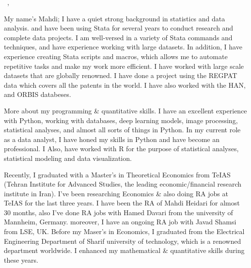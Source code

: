\documentclass[12pt]{letter}
\begin{document}
\AddToShipoutPictureBG{%
    \color{gr}
    \AtPageUpperLeft{\rule[-1.3in]{\paperwidth}{1.3in}}
}

\begin{center}
    {\fontsize{28}{0}\selectfont\scshape \myname}

    \href{mailto:\myemail}{\faEnvelope\enspace \myemail}\hfill
    \href{tel:\myphone}{\faPhone\enspace \myphone}\hfill
    \faMapMarker \enspace \mylocation
\end{center}

\vspace{0.3in}



\vspace{-0.1in}

\greeting\
\recipient,\\

\vspace{-0.1in}\setlength\parindent{24pt}

My name's Mahdi; I have a quiet strong background in statistics and data analysis.
and have been using Stata for several years to conduct research and complete
data projects. I am well-versed in a variety of Stata commands and techniques,
and have experience working with large datasets. In addition, I have experience
creating Stata scripts and macros, which allows me to automate repetitive tasks
and make my work more efficient. I have worked with large scale datasets that
are globally renowned. I have done a project using the REGPAT data which covers
all the patents in the world. I have also worked with the HAN, and ORBIS databeses.

\par

More about my programming \& quantitative skills. I have an excellent experience
with Python, working with databases, deep learning models, image processing,
statistical analyses, and almost all sorts of things in Python. In my current
role as a data analyst, I have honed my skills in Python and have become an
professional. I Also, have worked with R for the purpose of statistical analyses,
statistical modeling and data visualization.

\par

Recently, I graduated with a Master's in Theoretical Economics from TeIAS (Tehran
Institute for Advanced Studies, the leading economic/financial research institute
in Iran). I've been researching Economics \&
also doing RA jobs at TeIAS for the last three years. I have been the RA of Mahdi Heidari for almost 30 months, also I've done RA jobs
with Hamed Davari from the university of Mannheim, Germany.
moreover, I have an ongoing RA job with Javad Shamsi from LSE, UK.
Before my Maser's in Economics, I graduated from the Electrical Engineering Department
of Sharif university of technology, which is a renowned department worldwide.
I enhanced my mathematical \& quantitative skills during these years.
\end{document}
